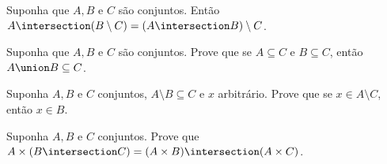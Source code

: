 \begin{exercise}
	Suponha que $A, B$ e $C$ são conjuntos. Então $A \intersection (B \setminus C) = (A \intersection B) \setminus C$.
\end{exercise}

\begin{exercise}
	Suponha que $A, B$ e $C$ são conjuntos. Prove que se $A \subseteq C$ e $B \subseteq C$, então $A \union B \subseteq C$.
\end{exercise}

\begin{exercise}
	Suponha $A, B$ e $C$ conjuntos, $A \setminus B \subseteq C$ e $x$ arbitrário. Prove que se $x \in A \setminus C$, então $x \in B$.
\end{exercise}

\begin{exercise}
	Suponha $A, B$ e $C$ conjuntos. Prove que $A \times (B \intersection C) = (A \times B) \intersection (A \times C)$.
\end{exercise}
